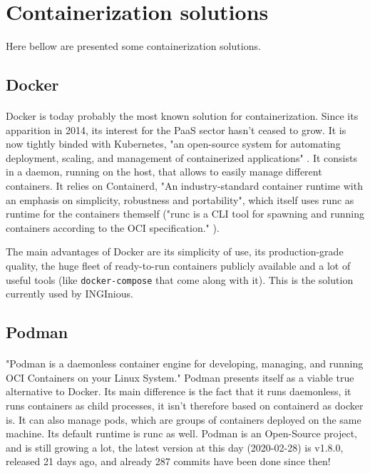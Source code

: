\section{Containerization solutions}

Here bellow are presented some containerization solutions.

\subsection{Docker}
\paragraph{}Docker\cite{merkel2014docker} is today probably the most known solution for containerization.  Since its apparition in 2014, its interest for the PaaS sector hasn't ceased to grow.  It is now tightly binded with Kubernetes, "an open-source system for automating deployment, scaling, and management of containerized applications" \cite{kubernetes}.  It consists in a daemon, running on the host, that allows to easily manage different containers.  It relies on Containerd, "An industry-standard container runtime with an emphasis on simplicity, robustness and portability"\cite{containerd}, which itself uses runc as runtime for the containers themself ("runc is a CLI tool for spawning and running containers according to the OCI specification." \cite{runc}).

The main advantages of Docker are its simplicity of use, its production-grade quality, the huge fleet of ready-to-run containers publicly available and a lot of useful tools (like \texttt{docker-compose} that come along with it).  This is the solution currently used by INGInious.

\subsection{Podman}
\paragraph{}"Podman is a daemonless container engine for developing, managing, and running OCI\cite{oci} Containers on your Linux System."\cite{podman}  Podman presents itself as a viable true alternative to Docker.  Its main difference is the fact that it runs daemonless, it runs containers as child processes, it isn't therefore based on containerd as docker is.  It can also manage pods, which are groups of containers deployed on the same machine. Its default runtime is runc as well.  Podman is an Open-Source project, and is still growing a lot, the latest version at this day (2020-02-28) is v1.8.0, released 21 days ago, and already 287 commits have been done since then!

